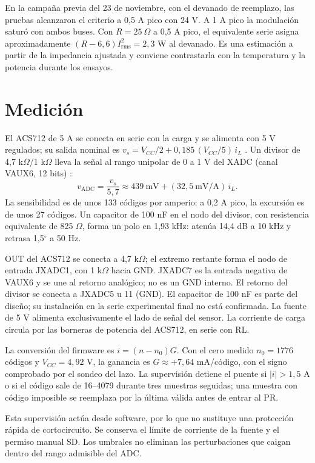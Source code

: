 \documentclass[conference]{IEEEtran}
\begin{document}
En la campaña previa del 23 de noviembre, con el devanado de reemplazo, las pruebas alcanzaron el criterio a 0,5 A pico con 24 V. A 1 A pico la modulación saturó con ambos buses. Con $R=25\ \Omega$ a 0,5 A pico, el equivalente serie asigna aproximadamente $(R-6{,}6)I_{\mathrm{rms}}^2=2{,}3$ W al devanado. Es una estimación a partir de la impedancia ajustada y conviene contrastarla con la temperatura y la potencia durante los ensayos.

\section{Medición}
El ACS712 de 5 A se conecta en serie con la carga y se alimenta con 5 V regulados; su salida nominal es $v_s=V_{CC}/2+0{,}185\,(V_{CC}/5)\,i_L$ \cite{acs}. Un divisor de 4,7 k$\Omega$/1 k$\Omega$ lleva la señal al rango unipolar de 0 a 1 V del XADC (canal VAUX6, 12 bits) \cite{xadc}:
\begin{equation}
v_{\mathrm{ADC}}=\frac{v_s}{5{,}7}\approx439\ \mathrm{mV}+(32{,}5\ \mathrm{mV/A})\,i_L .
\end{equation}
La sensibilidad es de unos 133 códigos por amperio: a 0,2 A pico, la excursión es de unos 27 códigos. Un capacitor de 100 nF en el nodo del divisor, con resistencia equivalente de 825 $\Omega$, forma un polo en 1,93 kHz: atenúa 14,4 dB a 10 kHz y retrasa 1,5$^\circ$ a 50 Hz.

OUT del ACS712 se conecta a 4,7 k$\Omega$; el extremo restante forma el nodo de entrada JXADC1, con 1 k$\Omega$ hacia GND. JXADC7 es la entrada negativa de VAUX6 y se une al retorno analógico; no es un GND interno. El retorno del divisor se conecta a JXADC5 u 11 (GND). El capacitor de 100 nF es parte del diseño; su instalación en la serie experimental final no está confirmada. La fuente de 5 V alimenta exclusivamente el lado de señal del sensor. La corriente de carga circula por las borneras de potencia del ACS712, en serie con RL.

La conversión del firmware es $i=(n-n_0)G$. Con el cero medido $n_0=1776$ códigos y $V_{CC}=4{,}92$ V, la ganancia es $G\approx+7{,}64$ mA/código, con el signo comprobado por el sondeo del lazo. La supervisión detiene el puente si $|i|>1{,}5$ A o si el código sale de 16--4079 durante tres muestras seguidas; una muestra con código imposible se reemplaza por la última válida antes de entrar al PR.

Esta supervisión actúa desde software, por lo que no sustituye una protección rápida de cortocircuito. Se conserva el límite de corriente de la fuente y el permiso manual SD. Los umbrales no eliminan las perturbaciones que caigan dentro del rango admisible del ADC.
\end{document}
